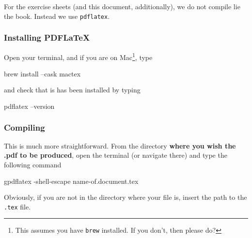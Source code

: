 \documentclass{article}
\begin{document}

For the exercise sheets (and this document, additionally), we do not compile lie the book. Instead we use \texttt{pdflatex}. 
\subsubsection{Installing PDFLaTeX}
Open your terminal, and if you are on Mac\footnote{This assumes you have \texttt{brew} installed. If you don't, then please do?}, type 
\begin{bashcode}
    brew install --cask mactex
 \end{bashcode}
 and check that is has been installed by typing 
 \begin{bashcode}
    pdflatex --version
\end{bashcode}
\subsubsection{Compiling}
This is much more straightforward. From the directory \textbf{where you wish the .pdf to be produced}, open the terminal (or navigate there) and type the following command
\begin{bashcode}
    gpdflatex -shell-escape name-of.document.tex
\end{bashcode}
Obviously, if you are not in the directory where your file is, insert the path to the \texttt{.tex} file.
\newpage
\end{document}
